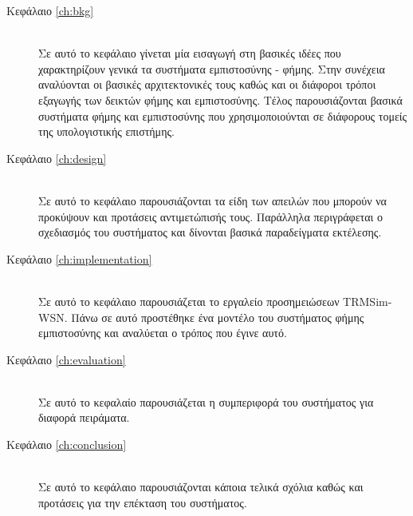 \begin{description} \item[Κεφάλαιο \ref{ch:bkg}] \hfill \\
Σε αυτό το κεφάλαιο γίνεται μία εισαγωγή στη βασικές ιδέες που χαρακτηρίζουν γενικά τα συστήματα εμπιστοσύνης - φήμης. Στην συνέχεια αναλύονται οι βασικές αρχιτεκτονικές τους καθώς και οι διάφοροι τρόποι εξαγωγής των δεικτών φήμης και εμπιστοσύνης. Τέλος παρουσιάζονται βασικά συστήματα φήμης και εμπιστοσύνης που χρησιμοποιούνται σε διάφορους τομείς της υπολογιστικής επιστήμης.

\item[Κεφάλαιο \ref{ch:design}] \hfill \\
Σε αυτό το κεφάλαιο παρουσιάζονται τα είδη των απειλών που μπορούν να προκύψουν και προτάσεις αντιμετώπισής τους. Παράλληλα περιγράφεται ο σχεδιασμός του συστήματος και δίνονται βασικά παραδείγματα εκτέλεσης.

\item[Κεφάλαιο \ref{ch:implementation}] \hfill \\
Σε αυτό το κεφάλαιο παρουσιάζεται το εργαλείο προσημειώσεων TRMSim-WSN.
 Πάνω σε αυτό προστέθηκε ένα μοντέλο του συστήματος φήμης εμπιστοσύνης και αναλύεται ο τρόπος που έγινε αυτό.

\item[Κεφάλαιο \ref{ch:evaluation}] \hfill \\
Σε αυτό το κεφαλαίο παρουσιάζεται η συμπεριφορά του συστήματος για διαφορά πειράματα.

\item[Κεφάλαιο \ref{ch:conclusion}] \hfill \\
Σε αυτό το κεφάλαιο παρουσιάζονται κάποια τελικά σχόλια καθώς και προτάσεις για την επέκταση του συστήματος.
\end{description}